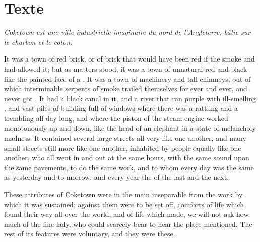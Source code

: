 \documentclass{fiche}
\begin{document}
\newpage
\section{Texte}

\noindent\small\textit{Coketown est une ville industrielle imaginaire du nord de
l'Angleterre, bâtie sur le charbon et le coton.}\normalsize

\begin{texte}
It was a town of red brick, or of brick that would have been red if the smoke and
 had allowed it; but as matters stood, it was a town of
unnatural red and black like the painted face of a . It was
a town of machinery and tall chimneys, out of which interminable serpents of smoke trailed
themselves for ever and ever, and never got . It had a black canal in it, and a river that ran purple with ill-smelling
, and vast piles of building full of windows where there was a
rattling and a trembling all day long, and where the piston of the steam-engine worked
monotonously up and down, like the head of an elephant in a state of melancholy madness. It
contained several large streets all very like one another, and many small streets still more
like one another, inhabited by people equally like one another, who all went in and out at
the same hours, with the same sound upon the same pavements, to do the same work, and to whom
every day was the same as yesterday and to-morrow, and every year the
 of the last and the next.

These attributes of Coketown were in the main inseparable from the work by which it was
sustained; against them were to be set off, comforts of life which found their way all over
the world, and  of life which made, we will not
ask how much of the fine lady, who could scarcely bear to hear the place mentioned. The rest
of its features were voluntary, and they were these.


\end{texte}
\end{document}
